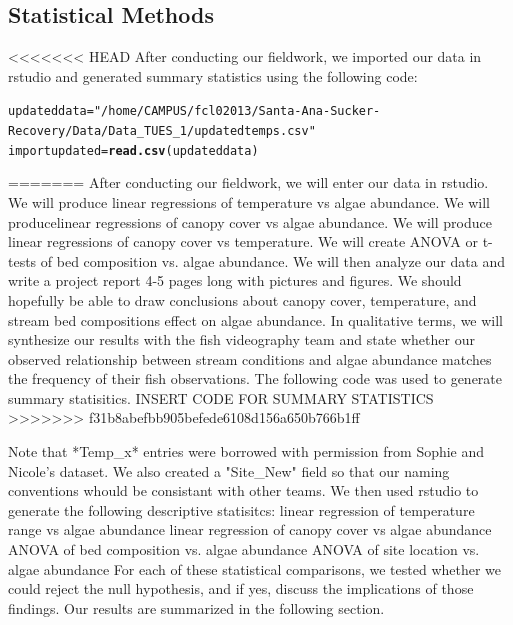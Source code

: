 \documentclass{article}\usepackage[]{graphicx}\usepackage[]{color}
\makeatletter
\newcommand{\hlstr}[1]{\textcolor[rgb]{0.192,0.494,0.8}{#1}}%
\newcommand{\hlstd}[1]{\textcolor[rgb]{0.345,0.345,0.345}{#1}}%
\newcommand{\hlkwb}[1]{\textcolor[rgb]{0.69,0.353,0.396}{#1}}%
\newcommand{\hlkwd}[1]{\textcolor[rgb]{0.737,0.353,0.396}{\textbf{#1}}}%
\newenvironment{kframe}{%
 \def\at@end@of@kframe{}%
 \ifinner\ifhmode%
  \def\at@end@of@kframe{\end{minipage}}%
  \begin{minipage}{\columnwidth}%
 \fi\fi%
 \def\FrameCommand##1{\hskip\@totalleftmargin \hskip-\fboxsep
 \colorbox{shadecolor}{##1}\hskip-\fboxsep
     \hskip-\linewidth \hskip-\@totalleftmargin \hskip\columnwidth}%
 \MakeFramed {\advance\hsize-\width
   \@totalleftmargin\z@ \linewidth\hsize
   \@setminipage}}%
 {\par\unskip\endMakeFramed%
 \at@end@of@kframe}
\newenvironment{knitrout}{}{} %
\makeatother
\begin{document}
\subsection{Statistical Methods}
<<<<<<< HEAD
After conducting our ﬁeldwork, we imported our data in rstudio and generated summary statistics using the following code: 
\begin{knitrout}
\color{fgcolor}\begin{kframe}
\begin{alltt}
\hlstd{updateddata}\hlkwb{=} \hlstr{"/home/CAMPUS/fcl02013/Santa-Ana-Sucker-Recovery/Data/Data_TUES_1/updatedtemps.csv"}
\hlstd{importupdated}\hlkwb{=}\hlkwd{read.csv}\hlstd{(updateddata)}
\end{alltt}
\end{kframe}
\end{knitrout}
=======
After conducting our ﬁeldwork, we will enter our data in rstudio. We will produce linear regressions of temperature vs algae abundance. We will producelinear regressions of canopy cover vs algae abundance. We will produce linear regressions of canopy cover vs temperature. We will create ANOVA or t-tests of bed composition vs. algae abundance. We will then analyze our data and write a project report 4-5 pages long with pictures and ﬁgures. We should hopefully be able to draw conclusions about canopy cover, temperature, and stream bed compositions eﬀect on algae abundance. In qualitative terms, we will synthesize our results with the ﬁsh videography team and state whether our observed relationship between stream conditions and algae abundance matches the frequency of their ﬁsh observations.
The following code was used to generate summary statisitics. 
INSERT CODE FOR SUMMARY STATISTICS
>>>>>>> f31b8abefbb905befede6108d156a650b766b1ff

Note that *Temp_x* entries were borrowed with permission from Sophie and Nicole's dataset. We also created a "Site_New" field so that our naming conventions whould be consistant with other teams. We then used rstudio to generate the following descriptive statisitcs:  
linear regression of temperature range vs algae abundance
linear regression of canopy cover vs algae abundance
ANOVA of bed composition vs. algae abundance
ANOVA of site location vs. algae abundance
For each of these statistical comparisons, we tested whether we could reject the null hypothesis, and if yes, discuss the implications of those findings. Our results are summarized in the following section. 
\end{document}
